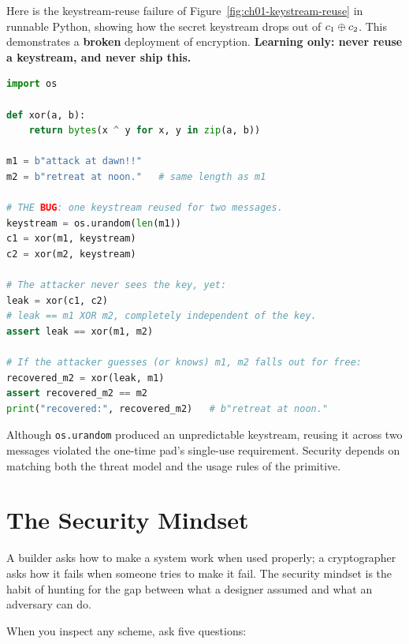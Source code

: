 \begin{implementbox}
Here is the keystream-reuse failure of Figure~\ref{fig:ch01-keystream-reuse} in runnable Python, showing how the secret keystream drops out of $c_1 \oplus c_2$. This demonstrates a \textbf{broken} deployment of encryption. \textbf{Learning only: never reuse a keystream, and never ship this.}
\begin{lstlisting}[language=Python]
import os

def xor(a, b):
    return bytes(x ^ y for x, y in zip(a, b))

m1 = b"attack at dawn!!"
m2 = b"retreat at noon."   # same length as m1

# THE BUG: one keystream reused for two messages.
keystream = os.urandom(len(m1))
c1 = xor(m1, keystream)
c2 = xor(m2, keystream)

# The attacker never sees the key, yet:
leak = xor(c1, c2)
# leak == m1 XOR m2, completely independent of the key.
assert leak == xor(m1, m2)

# If the attacker guesses (or knows) m1, m2 falls out for free:
recovered_m2 = xor(leak, m1)
assert recovered_m2 == m2
print("recovered:", recovered_m2)   # b"retreat at noon."
\end{lstlisting}
Although \texttt{os.urandom} produced an unpredictable keystream, reusing it across two messages violated the one-time pad's single-use requirement. Security depends on matching both the threat model and the usage rules of the primitive.
\end{implementbox}

\section{The Security Mindset}
\label{ch01:mindset}

A builder asks how to make a system work when used properly; a cryptographer asks how it fails when someone tries to make it fail. The security mindset is the habit of hunting for the gap between what a designer assumed and what an adversary can do.

When you inspect any scheme, ask five questions:

